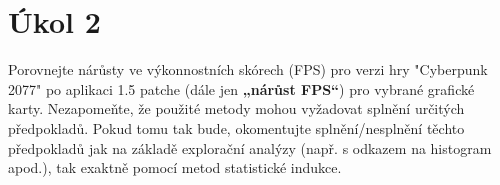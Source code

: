 \section*{Úkol 2}
\label{sec:task-2}

Porovnejte nárůsty ve výkonnostních skórech (FPS) pro verzi hry "Cyberpunk 2077" po aplikaci 1.5 patche (dále jen \textbf{„nárůst FPS“}) 
pro vybrané grafické karty. Nezapomeňte, že použité metody mohou vyžadovat splnění určitých předpokladů. Pokud tomu tak bude, okomentujte 
splnění/nesplnění těchto předpokladů jak na základě explorační analýzy (např. s odkazem na histogram apod.), tak exaktně pomocí metod statistické indukce.

\newcommand{\lowerThanZero}{$<$$<$ 0.001}

\newcommand{\shapireWilk}{0.006, 0.019}
\newcommand{\symmetryTest}{0.218, 0.016}
\newcommand{\ttValues}{5.600, "inf", 5.100, "inf"}
\newcommand{\rtxInterval}{(\tableValue{\ttValues}{0}, \tableValue{\ttValues}{1}) }
\newcommand{\amdInterval}{(\tableValue{\ttValues}{2}, \tableValue{\ttValues}{3}) }

\newcommand{\pointGuess}{0.400}
\newcommand{\wilcoxLeftSidedInterval}{$(0.399, \infty)$}

